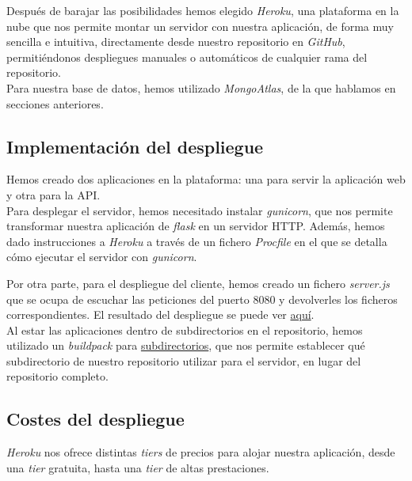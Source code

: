 Después de barajar las posibilidades hemos elegido \textit{Heroku}, una plataforma en la nube que nos permite montar un
servidor con nuestra aplicación, de forma muy sencilla e intuitiva, directamente desde nuestro repositorio en
\textit{GitHub}, permitiéndonos despliegues manuales o automáticos de cualquier rama del repositorio.\\

Para nuestra base de datos, hemos utilizado \textit{MongoAtlas}, de la que hablamos en secciones anteriores.\\

\subsection{Implementación del despliegue}
Hemos creado dos aplicaciones en la plataforma: una para servir la aplicación web y otra para la API.\\

Para desplegar el servidor, hemos necesitado instalar \textit{gunicorn}\cite{gunicorn}, que nos permite transformar
nuestra aplicación de \textit{flask} en un servidor HTTP. Además, hemos dado instrucciones a \textit{Heroku} a través de
un fichero \textit{Procfile} en el que se detalla cómo ejecutar el servidor con \textit{gunicorn}.

Por otra parte, para el despliegue del cliente, hemos creado un fichero \textit{server.js} que se ocupa de escuchar las
peticiones del puerto 8080 y devolverles los ficheros correspondientes. El resultado del despliegue se puede ver
\href{http://flixbuff-front.herokuapp.com/}{aquí}.\\

Al estar las aplicaciones dentro de subdirectorios en el repositorio, hemos utilizado un \textit{buildpack} para
\href{https://github.com/timanovsky/subdir-heroku-buildpack.git}{subdirectorios}, que nos permite establecer qué
subdirectorio de nuestro repositorio utilizar para el servidor, en lugar del repositorio completo.\\

\subsection{Costes del despliegue}\label{sec:costes-despliegue}
\textit{Heroku} nos ofrece distintas \textit{tiers} de precios para alojar nuestra aplicación, desde una \textit{tier}
gratuita, hasta una \textit{tier} de altas prestaciones.\\

